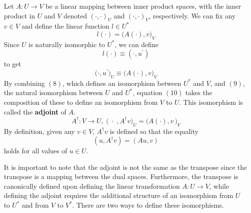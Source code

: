   \begin{definition}
    Let $A: U \longrightarrow V$ be a linear mapping between inner product spaces, with the inner product in $U$ and $V$ denoted $(\cdot,\cdot)_U$ and $(\cdot,\cdot)_V$, respectively. We can fix any $v \in V$ and define the linear function $l \in U^\ast$
    \begin{equation}
      l(\cdot) = \big(A(\cdot), v\big)_V
    \end{equation}
    Since $U$ is naturally isomorphic to $U^\ast$, we can define
    \begin{equation}
      l(\cdot) \equiv (\cdot, u^\prime)
    \end{equation} 
    to get 
    \begin{equation}
      \big(\cdot, u^\prime \big)_U \equiv \big(A(\cdot), v \big)_V
    \end{equation}
    By combining $(8)$, which defines an isomorphism between $U^\ast$ and $V$, and $(9)$, the natural isomorphism between $U$ and $U^\ast$, equation $(10)$ takes the composition of these to define an isomorphism from $V$ to $U$. This isomorphism is called the \textbf{adjoint} of $A$. 
    \begin{equation}
      A^\dagger: V \longrightarrow U, \;  \big(\; \cdot \;, A^\dagger v \big)_U = \big( A(\cdot), v \,\big)_V 
    \end{equation}
    By definition, given any $v \in V$, $A^\dagger v$ is defined so that the equality
    \begin{equation}
      (u, A^\dagger v) = (A u, v)
    \end{equation}
    holds for all values of $u \in U$. 
  \end{definition}

  It is important to note that the adjoint is not the same as the transpose since the transpose is a mapping between the dual spaces. Furthermore, the transpose is canonically defined upon defining the linear transformation $A: U \longrightarrow V$, while defining the adjoint requires the additional structure of an isomorphism from $U$ to $U^\ast$ and from $V$ to $V^\ast$. There are two ways to define these isomorphisms. 


